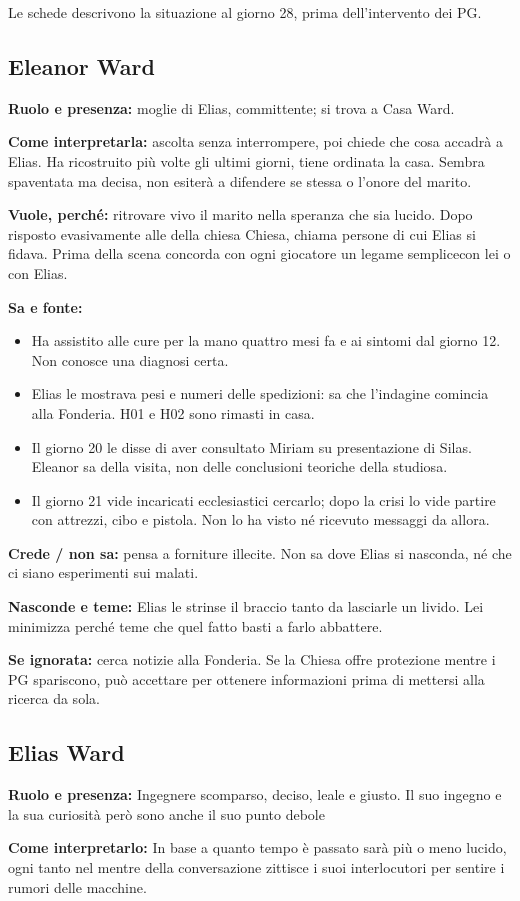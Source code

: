 \documentclass[11pt,a4paper]{article}
\begin{document}
\begin{gmbox}
Le schede descrivono la situazione al giorno 28, prima dell'intervento dei PG.
\end{gmbox}

\subsection{Eleanor Ward}
\textbf{Ruolo e presenza:} moglie di Elias, committente; si trova a Casa Ward.\par
\textbf{Come interpretarla:} ascolta senza interrompere, poi chiede che cosa accadrà a Elias. Ha ricostruito più volte gli ultimi giorni, tiene ordinata la casa. Sembra spaventata ma decisa, non esiterà a difendere se stessa o l'onore del marito.

\textbf{Vuole, perché:} ritrovare vivo il marito nella speranza che sia lucido. Dopo risposto evasivamente alle della chiesa Chiesa, chiama persone di cui Elias si fidava. Prima della scena concorda con ogni giocatore un legame semplicecon lei o con Elias.

\textbf{Sa e fonte:}
\begin{itemize}
\item Ha assistito alle cure per la mano quattro mesi fa e ai sintomi dal giorno 12. Non conosce una diagnosi certa.
\item Elias le mostrava pesi e numeri delle spedizioni: sa che l'indagine comincia alla Fonderia. H01 e H02 sono rimasti in casa.
\item Il giorno 20 le disse di aver consultato Miriam su presentazione di Silas. Eleanor sa della visita, non delle conclusioni teoriche della studiosa.
\item Il giorno 21 vide incaricati ecclesiastici cercarlo; dopo la crisi lo vide partire con attrezzi, cibo e pistola. Non lo ha visto né ricevuto messaggi da allora.
\end{itemize}
\textbf{Crede / non sa:} pensa a forniture illecite. Non sa dove Elias si nasconda, né che ci siano esperimenti sui malati. 

\textbf{Nasconde e teme:} Elias le strinse il braccio tanto da lasciarle un livido. Lei minimizza perché teme che quel fatto basti a farlo abbattere. 

\textbf{Se ignorata:} cerca notizie alla Fonderia. Se la Chiesa offre protezione mentre i PG spariscono, può accettare per ottenere informazioni prima di mettersi alla ricerca da sola.

\subsection{Elias Ward}
\textbf{Ruolo e presenza:} Ingegnere scomparso, deciso, leale e giusto. Il suo ingegno e la sua curiosità però sono anche il suo punto debole
\par
\textbf{Come interpretarlo:} In base a quanto tempo è passato sarà più o meno lucido, ogni tanto nel mentre della conversazione zittisce i suoi interlocutori per sentire i rumori delle macchine.
\end{document}

